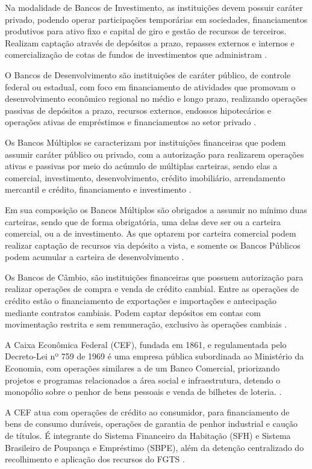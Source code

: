 \documentclass[
  12pt,
  12pt,
  openright,
  oneside,
  a4paper,
  chapter=TITLE,
  section=TITLE,
  subsection=TITLE,
  subsubsection=TITLE,
  english,
  portugues,
  sumario=tradicional]{abntex2}
\begin{document}
Na modalidade de Bancos de Investimento, as instituições devem possuir caráter privado, podendo operar participações temporárias em sociedades, financiamentos produtivos para ativo fixo e capital de giro e gestão de recursos de terceiros. Realizam captação através de depósitos a prazo, repasses externos e internos e comercialização de cotas de fundos de investimentos que administram \cite{Res:2624:1999}.

O Bancos de Desenvolvimento são instituições de caráter público, de controle federal ou estadual, com foco em financiamento de atividades que promovam o desenvolvimento econômico regional no médio e longo prazo, realizando operações passivas de depósitos a prazo, recursos externos, endossos hipotecários e operações ativas de empréstimos e financiamentos ao setor privado \cite{Res:394:1976}.

Os Bancos Múltiplos se caracterizam por instituições financeiras que podem assumir caráter público ou privado, com a autorização para realizarem operações ativas e passivas por meio do acúmulo de múltiplas carteiras, sendo elas a comercial, investimento, desenvolvimento, crédito imobiliário, arrendamento mercantil e crédito, financiamento e investimento \cite{Res:2099:1994}.

Em sua composição os Bancos Múltiplos são obrigados a assumir no mínimo duas carteiras, sendo que de forma obrigatória, uma delas deve ser ou a carteira comercial, ou a de investimento. As que optarem por carteira comercial podem realizar captação de recursos via depósito a vista, e somente os Bancos Públicos podem acumular a carteira de desenvolvimento \cite{Res:2099:1994}.

Os Bancos de Câmbio, são instituições financeiras que possuem autorização para realizar operações de compra e venda de crédito cambial. Entre as operações de crédito estão o financiamento de exportações e importações e antecipação mediante contratos cambiais. Podem captar depósitos em contas com movimentação restrita e sem remuneração, exclusivo às operações cambiais \cite{Res:3426:2006}.

A Caixa Econômica Federal (CEF), fundada em 1861, e regulamentada pelo Decreto-Lei nº 759 de 1969 é uma empresa pública subordinada ao Ministério da Economia, com operações similares a de um Banco Comercial, priorizando projetos e programas relacionados a área social e infraestrutura, detendo o monopólio sobre o penhor de bens pessoais e venda de bilhetes de loteria. \cite{DL:759:1969}.

A CEF atua com operações de crédito ao consumidor, para financiamento de bens
de consumo duráveis, operações de garantia de penhor industrial e caução de
títulos. É integrante do Sistema Financeiro da Habitação (SFH) e Sistema
Brasileiro de Poupança e Empréstimo (SBPE), além da detenção centralizado do recolhimento e aplicação dos recursos do FGTS \cite{DL:759:1969}.
\end{document}

